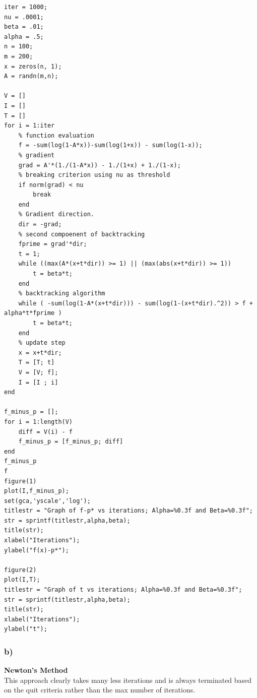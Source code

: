 \documentclass[12pt]{article}
\begin{document}
\begin{lstlisting}
iter = 1000;
nu = .0001;
beta = .01;
alpha = .5;
n = 100;
m = 200;
x = zeros(n, 1);
A = randn(m,n);

V = []
I = []
T = []
for i = 1:iter
    % function evaluation
    f = -sum(log(1-A*x))-sum(log(1+x)) - sum(log(1-x));
    % gradient
    grad = A'*(1./(1-A*x)) - 1./(1+x) + 1./(1-x);
    % breaking criterion using nu as threshold
    if norm(grad) < nu
        break
    end
    % Gradient direction.
    dir = -grad;
    % second compoenent of backtracking
    fprime = grad'*dir;
    t = 1; 
    while ((max(A*(x+t*dir)) >= 1) || (max(abs(x+t*dir)) >= 1))
        t = beta*t;
    end
    % backtracking algorithm
    while ( -sum(log(1-A*(x+t*dir))) - sum(log(1-(x+t*dir).^2)) > f + alpha*t*fprime )
        t = beta*t;
    end
    % update step
    x = x+t*dir;
    T = [T; t]
    V = [V; f];
    I = [I ; i]
end

f_minus_p = [];
for i = 1:length(V)
    diff = V(i) - f
    f_minus_p = [f_minus_p; diff]
end
f_minus_p
f
figure(1)
plot(I,f_minus_p);
set(gca,'yscale','log');
titlestr = "Graph of f-p* vs iterations; Alpha=%0.3f and Beta=%0.3f";
str = sprintf(titlestr,alpha,beta);
title(str);
xlabel("Iterations");
ylabel("f(x)-p*");

figure(2)
plot(I,T);
titlestr = "Graph of t vs iterations; Alpha=%0.3f and Beta=%0.3f";
str = sprintf(titlestr,alpha,beta);
title(str);
xlabel("Iterations");
ylabel("t");
\end{lstlisting}

\subsubsection*{b)}
\textbf{Newton's Method}\\
This approach clearly takes many less iterations and is always terminated based on the quit criteria rather than the max number of iterations. 
\end{document}
